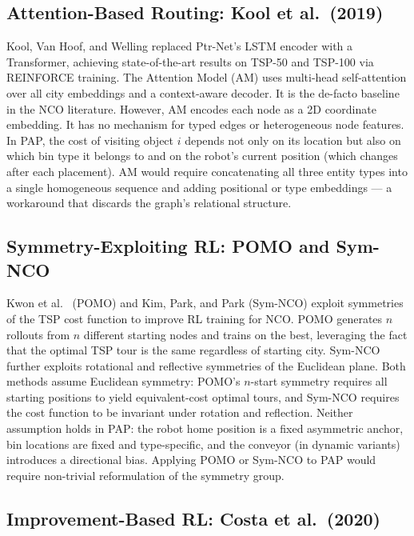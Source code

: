 \documentclass[conference]{IEEEtran}
\begin{document}
\subsection{Attention-Based Routing: Kool et al.\ (2019)}

Kool, Van Hoof, and Welling \cite{kool2019attention} replaced Ptr-Net's LSTM encoder with a Transformer, achieving state-of-the-art results on TSP-50 and TSP-100 via REINFORCE training. The Attention Model (AM) uses multi-head self-attention over all city embeddings and a context-aware decoder. It is the de-facto baseline in the NCO literature. However, AM encodes each node as a 2D coordinate embedding. It has no mechanism for typed edges or heterogeneous node features. In PAP, the cost of visiting object $i$ depends not only on its location but also on which bin type it belongs to and on the robot's current position (which changes after each placement). AM would require concatenating all three entity types into a single homogeneous sequence and adding positional or type embeddings --- a workaround that discards the graph's relational structure.

\subsection{Symmetry-Exploiting RL: POMO and Sym-NCO}

Kwon et al.\ \cite{kwon2020pomo} (POMO) and Kim, Park, and Park \cite{kim2022symnco} (Sym-NCO) exploit symmetries of the TSP cost function to improve RL training for NCO. POMO generates $n$ rollouts from $n$ different starting nodes and trains on the best, leveraging the fact that the optimal TSP tour is the same regardless of starting city. Sym-NCO further exploits rotational and reflective symmetries of the Euclidean plane. Both methods assume Euclidean symmetry: POMO's $n$-start symmetry requires all starting positions to yield equivalent-cost optimal tours, and Sym-NCO requires the cost function to be invariant under rotation and reflection. Neither assumption holds in PAP: the robot home position is a fixed asymmetric anchor, bin locations are fixed and type-specific, and the conveyor (in dynamic variants) introduces a directional bias. Applying POMO or Sym-NCO to PAP would require non-trivial reformulation of the symmetry group.

\subsection{Improvement-Based RL: Costa et al.\ (2020)}
\end{document}
